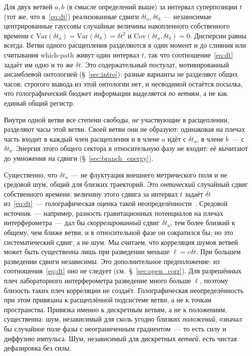 \documentclass[12pt,a4paper]{article}
\begin{document}
Для двух ветвей $a,b$ (в смысле определений выше) за интервал суперпозиции $t$ (тот же, что в~\eqref{eq:dt}) реализованные сдвиги $\delta t_a,\delta t_b$~--- независимые центрированные гауссовы случайные величины накопленного собственного времени с $\mathrm{Var}(\delta t_a)=\mathrm{Var}(\delta t_b)=\delta t^2$ и $\mathrm{Cov}(\delta t_a,\delta t_b)=0$. Дисперсии равны всегда. Ветви одного расщепления разделяются в один момент и до слияния или считывания which-path живут один интервал $t$, так что соотношение~\eqref{eq:dt} задаёт им одно и то же $\delta t$. Это содержательный постулат, мотивированный ансамблевой онтологией (\S~\ref{sec:intro}): разные варианты не разделяют общих часов; строгого вывода из этой онтологии нет, и несводимой остаётся посылка, что голографический бюджет информации выделяется \emph{по ветвям}, а не как единый общий регистр.

Внутри одной ветви все степени свободы, \emph{не} участвующие в расщеплении, разделяют часы этой ветви. Своей ветви они не образуют: одинаковая на плечах часть входит в каждый член расщепления и в члене $a$ идёт с $\delta t_a$, в члене $b$~--- с $\delta t_b$. Энергия этого общего сектора в относительную фазу не входит: её вычитают до умножения на сдвиги (\S~\ref{sec:branch_energy}).

Существенно, что $\delta t_a$~--- не флуктуация внешнего метрического поля и не средовой шум, общий для близких траекторий. Это \emph{онтический} случайный сдвиг собственного времени; величину этого сдвига за интервал $t$ задаёт $\delta t$ из~\eqref{eq:dt}~--- голографическая оценка такой неопределённости~\cite{ng2005foam}. Средовой источник~--- например, разность гравитационных потенциалов на плечах интерферометра~--- дал бы \emph{скоррелированный} сдвиг $\delta t_a$, тем более близкий к общему, чем ближе ветви, и в относительной фазе он сократился бы; но это систематический сдвиг, а не шум. Мы считаем, что корреляция шумов ветвей может быть существенна лишь при разведении меньше $\ell=c\delta t$. При большем разведении сдвиги независимы. Это дополнительное предположение: из соотношения~\eqref{eq:dt} оно не следует (см.~\S~\ref{sec:open_corr}). Для разрешённых плеч лабораторного интерферометра разведение много больше $\ell$, поэтому близость таких плеч корреляции не создаёт. Голографическая неопределённость при этом привязана к расщеплённой подсистеме ветви, а не к точкам пространства. Привязка именно к дискретным ветвям, а не к положениям, существенна: шум, независимый для сколь угодно близких \emph{положений}, означал бы случайное поле фазы с неограниченным градиентом~--- то есть силу и диффузию импульса. Шум, независимый для дискретных \emph{ветвей}, есть чистая дефазировка без силы.
\end{document}
